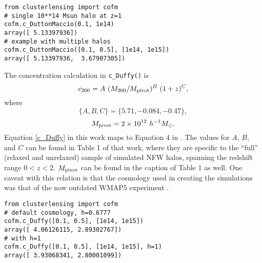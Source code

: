 \documentclass[twocolumn]{aastex6}
\newcommand{\code}{\lstinline[style=codeintext]}
\begin{document}
\begin{lstlisting}
from clusterlensing import cofm
# single 10**14 Msun halo at z=1
cofm.c_DuttonMaccio(0.1, 1e14)
array([ 5.13397936])
# example with multiple halos
cofm.c_DuttonMaccio([0.1, 0.5], [1e14, 1e15])
array([ 5.13397936,  3.67907305])
\end{lstlisting}

The concentration calculation in \code{c_Duffy()} is
\begin{equation}\label{c_Duffy}
c_{200} = A\ (M_{200} / M_{\rm pivot})^B \ (1 + z)^C,
\end{equation}
where
\begin{equation}
\{A, B, C\} = \{5.71, -0.084, -0.47\},
\end{equation}
\begin{equation}
M_{\rm pivot} = 2 \times 10^{12}\ h^{-1} M_{\odot}.
\end{equation}
Equation \ref{c_Duffy} in this work maps to Equation 4 in \citet{Duffy08}. The values for $A$, $B$, and $C$ can be found in Table 1 of that work, where they are specific to the ``full'' (relaxed and unrelaxed) sample of simulated NFW halos, spanning the redshift range $0 < z < 2$. $M_{\rm pivot}$ can be found in the caption of Table 1 as well. One caveat with this relation is that the cosmology used in creating the \citet{Duffy08} simulations was that of the now outdated WMAP5 experiment \citep{WMAP5}.

\begin{lstlisting}
from clusterlensing import cofm
# default cosmology, h=0.6777
cofm.c_Duffy([0.1, 0.5], [1e14, 1e15])
array([ 4.06126115, 2.89302767])
# with h=1
cofm.c_Duffy([0.1, 0.5], [1e14, 1e15], h=1)
array([ 3.93068341, 2.80001099])
\end{lstlisting}
\end{document}
